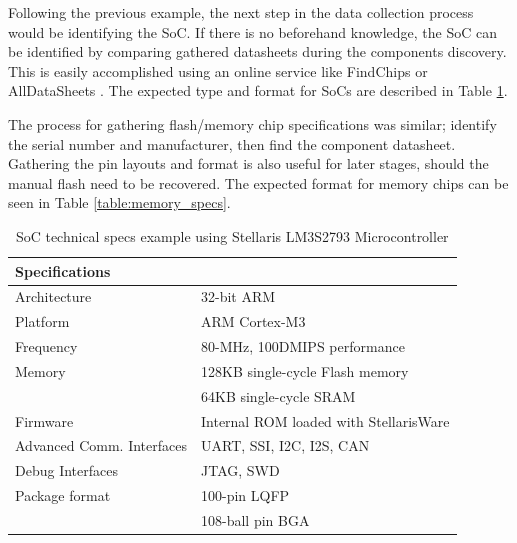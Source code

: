 Following the previous example, the next step in the data collection process would be identifying the SoC. If there is no beforehand knowledge, the SoC can be identified by comparing gathered datasheets during the components discovery. This is easily accomplished using an online service like FindChips or AllDataSheets \autocite{FindchipsElectronicPart}. The expected type and format for SoCs are described in Table \ref{table:soc_specs}.

The process for gathering flash/memory chip specifications was similar; identify the serial number and manufacturer, then find the component datasheet. Gathering the pin layouts and format is also useful for later stages, should the manual flash need to be recovered. The expected format for memory chips can be seen in Table \ref{table:memory_specs}.

\begin{table}
  \centering
  \label{table:soc_specs}%
  \caption{SoC technical specs example using Stellaris LM3S2793 Microcontroller}
  \begin{tabular}{|p{4cm}|p{12cm}|}
    \hline\rowcolor{gray!30}

    \textbf{Specifications} &  \\
    \hline

    Architecture & 32-bit ARM \\
    \hline

    Platform & ARM Cortex-M3 \\
    \hline

    Frequency & 80-MHz, 100DMIPS performance \\
    \hline

    Memory & 128KB single-cycle Flash memory \\
     & 64KB single-cycle SRAM \\
    \hline

    Firmware & Internal ROM loaded with StellarisWare \\
    \hline

    Advanced Comm. Interfaces & UART, SSI, I2C, I2S, CAN \\
    \hline

    Debug Interfaces & JTAG, SWD \\
    \hline

    Package format & 100-pin LQFP \\
    & 108-ball pin BGA \\
    \hline

  \end{tabular}
\end{table}

